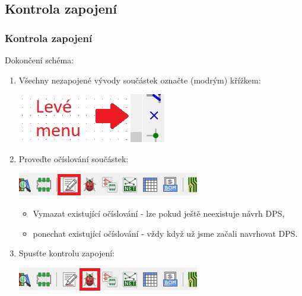 \documentclass{beamer}
\begin{document}
\subsection{\texorpdfstring{Kontrola zapojení}{Kontrola zapojeni}}
\begin{frame}
	\frametitle{Kontrola zapojení}
	Dokončení schéma:
	
	\begin{enumerate}
		\item Všechny nezapojené vývody součástek označte (modrým) křížkem: 
			\begin{center}
				\includegraphics[scale=0.5]{obr/kontrola01.png}
			\end{center}
			
		\item Proveďte očíslování součástek:
			\begin{center}
				\includegraphics[scale=0.5]{obr/kontrola02.png}
			\end{center}
			\begin{itemize}
				\item Vymazat existující očíslování - lze pokud ještě neexistuje návrh DPS,
				\item ponechat existující očíslování - vždy když už jsme začali navrhovat DPS.
			\end{itemize}
		
		\item Spusťte kontrolu zapojení:
			\begin{center}
				\includegraphics[scale=0.5]{obr/kontrola03.png}
			\end{center}
	\end{enumerate}
\end{frame}
\end{document}
